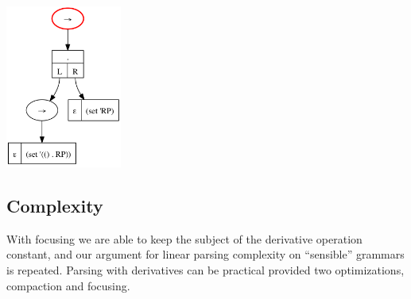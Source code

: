 \begin{center}
 \includegraphics[width=1.5in]{parens-short-step-4-f.png}
\end{center}

\subsection{Complexity}

With focusing we are able to keep the subject of the derivative operation
constant, and our argument for linear parsing complexity on ``sensible''
grammars is repeated.
%
Parsing with derivatives can be practical provided two optimizations,
compaction and focusing.

